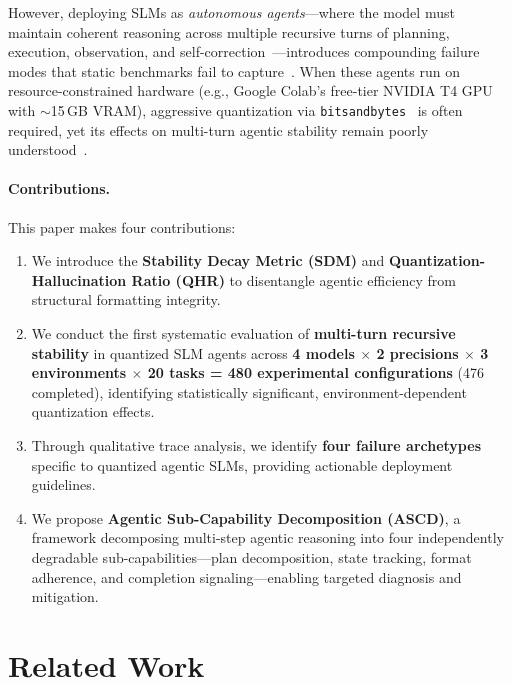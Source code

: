 \documentclass{article}
\begin{document}
However, deploying SLMs as \emph{autonomous agents}---where the model must maintain coherent reasoning across multiple recursive turns of planning, execution, observation, and self-correction~\cite{yao2022react}---introduces compounding failure modes that static benchmarks fail to capture~\cite{dong2025acbench,liu2023agentbench}. When these agents run on resource-constrained hardware (e.g., Google Colab's free-tier NVIDIA T4 GPU with $\sim$15\,GB VRAM), aggressive quantization via \texttt{bitsandbytes}~\cite{dettmers2022llm,dettmers2023qlora} is often required, yet its effects on multi-turn agentic stability remain poorly understood~\cite{colm2025quantization}.

\paragraph{Contributions.} This paper makes four contributions:
\begin{enumerate}[nosep]
  \item We introduce the \textbf{Stability Decay Metric (SDM)} and \textbf{Quantization-Hallucination Ratio (QHR)} to disentangle agentic efficiency from structural formatting integrity.
  \item We conduct the first systematic evaluation of \textbf{multi-turn recursive stability} in quantized SLM agents across \textbf{4 models $\times$ 2 precisions $\times$ 3 environments $\times$ 20 tasks = 480 experimental configurations} (476 completed), identifying statistically significant, environment-dependent quantization effects.
  \item Through qualitative trace analysis, we identify \textbf{four failure archetypes} specific to quantized agentic SLMs, providing actionable deployment guidelines.
  \item We propose \textbf{Agentic Sub-Capability Decomposition (ASCD)}, a framework decomposing multi-step agentic reasoning into four independently degradable sub-capabilities---plan decomposition, state tracking, format adherence, and completion signaling---enabling targeted diagnosis and mitigation.
\end{enumerate}

\section{Related Work}
\end{document}
